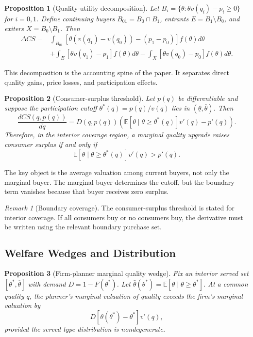 \documentclass[12pt]{article}
\theoremstyle{plain}
\newtheorem{proposition}{Proposition}
\theoremstyle{definition}
\theoremstyle{remark}
\newtheorem{remark}{Remark}
\begin{document}
\begin{proposition}[Quality-utility decomposition]
Let $B_i=\{\theta:\theta v(q_i)-p_i\geq 0\}$ for $i=0,1$. Define continuing buyers $B_{01}=B_0\cap B_1$, entrants $E=B_1\setminus B_0$, and exiters $X=B_0\setminus B_1$. Then
\[
\begin{aligned}
\Delta CS
=&\int_{B_{01}}\left[\theta(v(q_1)-v(q_0))-(p_1-p_0)\right]f(\theta)d\theta\\
&+\int_E [\theta v(q_1)-p_1]f(\theta)d\theta
-\int_X [\theta v(q_0)-p_0]f(\theta)d\theta.
\end{aligned}
\]
\end{proposition}

This decomposition is the accounting spine of the paper. It separates direct quality gains, price losses, and participation effects.

\begin{proposition}[Consumer-surplus threshold]
Let $p(q)$ be differentiable and suppose the participation cutoff $\theta^*(q)=p(q)/v(q)$ lies in $(\underline\theta,\overline\theta)$. Then
\[
 \frac{dCS(q,p(q))}{dq}=D(q,p(q))\left(\mathbb E[\theta\mid\theta\geq\theta^*(q)]v'(q)-p'(q)\right).
\]
Therefore, in the interior coverage region, a marginal quality upgrade raises consumer surplus if and only if
\[
 \mathbb E[\theta\mid\theta\geq\theta^*(q)]v'(q)>p'(q).
\]
\end{proposition}

The key object is the average valuation among current buyers, not only the marginal buyer. The marginal buyer determines the cutoff, but the boundary term vanishes because that buyer receives zero surplus.

\begin{remark}[Boundary coverage]
The consumer-surplus threshold is stated for interior coverage. If all consumers buy or no consumers buy, the derivative must be written using the relevant boundary purchase set.
\end{remark}

\subsection{Welfare Wedges and Distribution}

\begin{proposition}[Firm-planner marginal quality wedge]
Fix an interior served set $[\theta^*,\overline\theta]$ with demand $D=1-F(\theta^*)$. Let $\bar\theta(\theta^*)=\mathbb E[\theta\mid\theta\geq\theta^*]$. At a common quality $q$, the planner's marginal valuation of quality exceeds the firm's marginal valuation by
\[
 D[\bar\theta(\theta^*)-\theta^*]v'(q),
\]
provided the served type distribution is nondegenerate.
\end{proposition}
\end{document}

